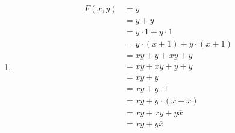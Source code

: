 \documentclass[12pt letter]{report}
\begin{document}
{\begin{enumerate}
          \begin{align*}
            F \left( x, y \right) & = 1                                                                       \\
                                  & = x + \overline{x} \tag*{By Unit Property}                                \\
                                  & = x \cdot 1 + \overline{x} \cdot 1 \tag*{By Second Identity Law}          \\
                                  & = x \cdot \left( y + \overline{y} \right) + \overline{x} \cdot \left( y +
            \overline{y} \right) \tag*{By Unit Property}                                                      \\
                                  & =  xy + x\overline{y} + \overline{x}y + \overline{x}\overline{y} \tag*{By
            Second Distributive Law}                                                                          \\
          \end{align*}
    \item
          \begin{align*}
            F \left( x, y \right) & = y                                                                                          \\
                                  & = y + y \tag*{By First Idempotent Law}                                                       \\
                                  & = y\cdot 1 + y \cdot 1 \tag*{By Second Identity Law}                                         \\
                                  & = y \cdot \left( x + 1 \right) + y\cdot  \left( x + 1 \right) \tag*{By First Domination Law} \\
                                  & = xy + y + xy + y \tag*{By Second Distributive Law}                                          \\
                                  & = xy + xy + y + y \tag*{By First Commutative Law}                                            \\
                                  & = xy + y \tag*{By First Idempotent Law}                                                      \\
                                  & =  xy + y \cdot 1 \tag*{By Second Identity Law}                                              \\
                                  & = xy + y \cdot \left( x + \overline{x} \right) \tag*{By Unit Property Law}                   \\
                                  & = xy + xy + y\overline{x} \tag*{By Second Distributive Law}                                  \\
                                  & = xy + y\overline{x} \tag*{By First Idempotent Law }                                         \\
          \end{align*}
  \end{enumerate}

}
\end{document}
